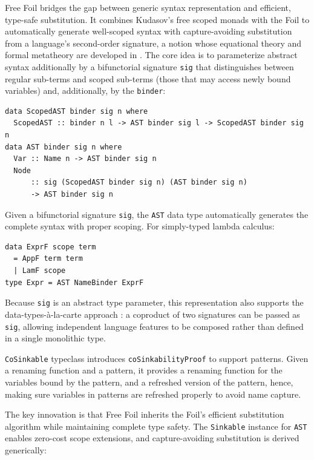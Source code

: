 Free Foil bridges the gap between generic syntax representation and efficient, type-safe substitution. 
It combines Kudasov's free scoped monads \cite{freemonads2024} with the Foil to automatically generate well-scoped syntax with capture-avoiding substitution from a language's second-order signature, a notion whose equational theory and formal metatheory are developed in \cite{secondOrderEquational2010, formalMetatheorySoas2022}.
The core idea is to parameterize abstract syntax additionally by a bifunctorial signature \texttt{sig} that distinguishes between regular sub-terms and scoped sub-terms (those that may access newly bound variables) and, additionally, by the \texttt{binder}:

\begin{verbatim}
data ScopedAST binder sig n where
  ScopedAST :: binder n l -> AST binder sig l -> ScopedAST binder sig n
data AST binder sig n where
  Var :: Name n -> AST binder sig n
  Node 
      :: sig (ScopedAST binder sig n) (AST binder sig n) 
      -> AST binder sig n
\end{verbatim}

Given a bifunctorial signature \texttt{sig}, the \texttt{AST} data type automatically generates the complete syntax with proper scoping. 
For simply-typed lambda calculus:

\begin{verbatim}
data ExprF scope term
  = AppF term term
  | LamF scope
type Expr = AST NameBinder ExprF
\end{verbatim}

Because \texttt{sig} is an abstract type parameter, this representation also supports the data-types-à-la-carte approach \cite{datatypesAlaCarte2008}: a coproduct of two signatures can be passed as \texttt{sig}, allowing independent language features to be composed rather than defined in a single monolithic type.

\texttt{CoSinkable} typeclass introduces \texttt{coSinkabilityProof} to support patterns. Given a renaming function and a pattern, it provides a renaming function for the variables bound by the pattern, and a refreshed version of the pattern, hence, making sure variables in patterns are refreshed properly to avoid name capture.

The key innovation is that Free Foil inherits the Foil's efficient substitution algorithm while maintaining complete type safety. The \texttt{Sinkable} instance for \texttt{AST} enables zero-cost scope extensions, and capture-avoiding substitution is derived generically:

